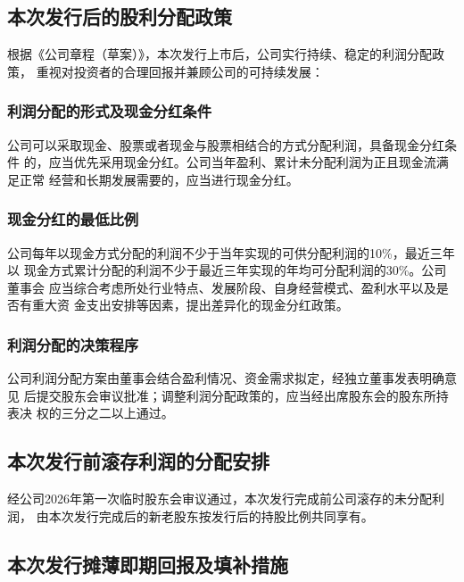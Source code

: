 
\subsection{本次发行后的股利分配政策}

根据《公司章程（草案）》，本次发行上市后，公司实行持续、稳定的利润分配政策，
重视对投资者的合理回报并兼顾公司的可持续发展：

\subsubsection{利润分配的形式及现金分红条件}

公司可以采取现金、股票或者现金与股票相结合的方式分配利润，具备现金分红条件
的，应当优先采用现金分红。公司当年盈利、累计未分配利润为正且现金流满足正常
经营和长期发展需要的，应当进行现金分红。

\subsubsection{现金分红的最低比例}

公司每年以现金方式分配的利润不少于当年实现的可供分配利润的10\%，最近三年以
现金方式累计分配的利润不少于最近三年实现的年均可分配利润的30\%。公司董事会
应当综合考虑所处行业特点、发展阶段、自身经营模式、盈利水平以及是否有重大资
金支出安排等因素，提出差异化的现金分红政策。

\subsubsection{利润分配的决策程序}

公司利润分配方案由董事会结合盈利情况、资金需求拟定，经独立董事发表明确意见
后提交股东会审议批准；调整利润分配政策的，应当经出席股东会的股东所持表决
权的三分之二以上通过。

\subsection{本次发行前滚存利润的分配安排}

经公司2026年第一次临时股东会审议通过，本次发行完成前公司滚存的未分配利润，
由本次发行完成后的新老股东按发行后的持股比例共同享有。

\subsection{本次发行摊薄即期回报及填补措施}

